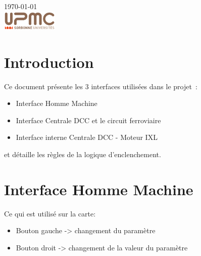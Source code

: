 \begin{titlepage}
{\large \today}\\[2cm] %


\includegraphics[width=0.2\textwidth]{logo.png}


\vfill %

\end{titlepage}




\section{Introduction}
\label{sec:introduction}
Ce document présente les  3 interfaces utilisées dans le projet~:
\begin{itemize}
\item Interface Homme Machine
\item Interface Centrale DCC et le circuit ferroviaire
\item Interface interne Centrale DCC - Moteur IXL
\end{itemize}

et détaille les règles de la logique d'enclenchement.


\section{Interface Homme Machine}
\label{sec:int-dcc}
Ce qui est utilisé sur la carte:
\begin{itemize}
\item Bouton gauche -> changement du paramètre
\item Bouton droit  -> changement de la valeur du paramètre
\end{itemize}

